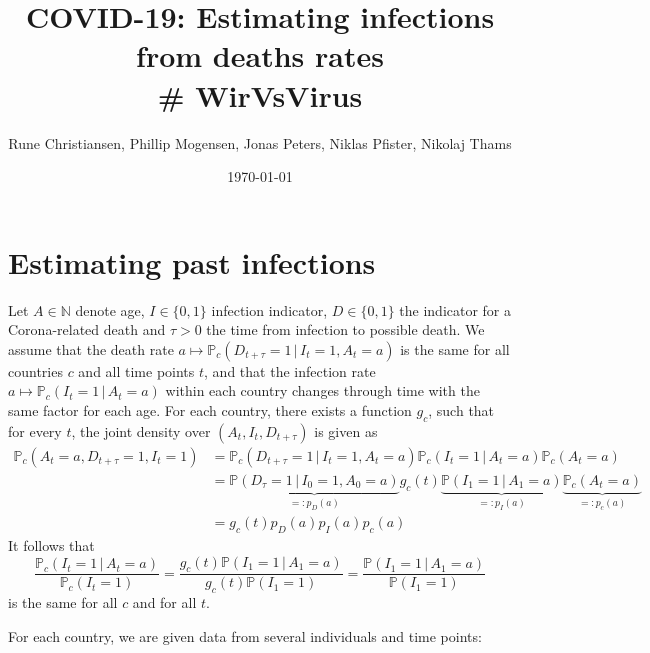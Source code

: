 \documentclass[a4paper]{article}
\title{COVID-19: Estimating infections from deaths rates \\ \# WirVsVirus}
\author{Rune Christiansen, Phillip Mogensen, Jonas Peters, Niklas Pfister, Nikolaj Thams}
\date{\today}
\newcommand\N{\mathbb{N}}
\renewcommand\P{\mathbb{P}}
\newcommand{\given}{\, \vert \,}
\begin{document}
\maketitle

\section{Estimating past infections}

Let $A \in \N$ denote age, $I \in \{0,1\}$ infection indicator, $D \in \{0,1\}$ the indicator for a Corona-related death and $\tau > 0$
the time from infection to possible death. We assume that the death rate $a \mapsto \P_c(D_{t+\tau} = 1 \given I_t = 1, A_t = a)$ is 
the same for all countries $c$ and all time points $t$, and that the infection rate $a \mapsto \P_c(I_{t} = 1 \given A_t = a)$ within 
each country changes through time with the same factor for each age. For each country, there exists a function $g_c$, such that for every $t$, the joint
density over $(A_t,I_t,D_{t+\tau})$ is given as
%
\begin{align*}
\P_c(A_t = a, D_{t+\tau} = 1, I_t = 1)	&= \P_c(D_{t+\tau} = 1 \given I_t = 1, A_t = a)  \P_c(I_t = 1 \given A_t = a) \P_c(A_t = a) \\
															&= \underbrace{\P(D_{\tau} = 1 \given I_0 = 1, A_0 = a)}_{=:p_D(a)} g_c(t) \underbrace{\P(I_1 = 1 \given A_1 = a)}_{=:p_I(a)} \underbrace{\P_c(A_t = a)}_{=:p_c(a)} \\
															&=  g_c(t) p_D(a) p_I(a) p_c(a)
\end{align*}
%
It follows that 
$$
\frac{\P_c(I_t = 1 \given A_t = a)}{\P_c(I_t = 1)} = \frac{g_c(t) \P(I_1 = 1 \given A_1 = a)}{g_c(t) \P(I_1 = 1)} = \frac{\P(I_1 = 1 \given A_1 = a)}{ \P(I_1 = 1)}
$$
is the same for all $c$ and for all $t$. 


For each country, we are given data from several individuals and time points:
\end{document}
